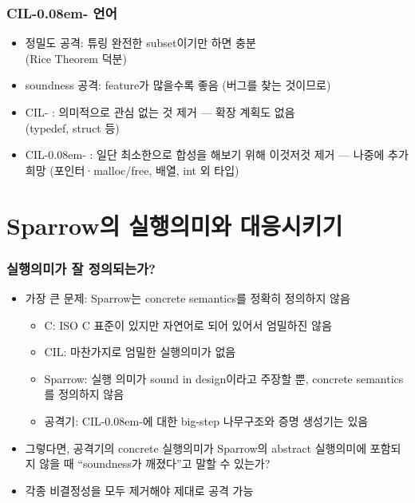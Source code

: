 \documentclass{simplesnt}
\newcommand{\CILmm}{\texorpdfstring{CIL-\kern0.08em-}{CIL--}}
\begin{document}
\begin{frame}
  \frametitle{\CILmm{} 언어}
  \begin{itemize}
    \item<1-> 정밀도 공격: 튜링 완전한 subset이기만 하면 충분 \\
    (Rice Theorem 덕분)
    \item<2-> soundness 공격: feature가 많을수록 좋음 (버그를 찾는 것이므로)
    \item<3-> CIL- : 의미적으로 관심 없는 것 제거 --- 확장 계획도 없음 \\
    (typedef, struct 등)
    \item<4-> \CILmm{} : 일단 최소한으로 합성을 해보기 위해 이것저것 제거 --- 나중에 추가 희망 (포인터·malloc/free, 배열, int 외 타입)
  \end{itemize}
\end{frame}

\section{Sparrow의 실행의미와 대응시키기}

\begin{frame}
  \frametitle{실행의미가 잘 정의되는가?}

  \begin{itemize}
    \item<1-> 가장 큰 문제: Sparrow는 concrete semantics를 정확히 정의하지 않음
      \begin{itemize}
        \item<2-> C: ISO C 표준이 있지만 자연어로 되어 있어서 엄밀하진 않음
        \item<3-> CIL: 마찬가지로 엄밀한 실행의미가 없음
        \item<4-> Sparrow: 실행 의미가 sound in design이라고 주장할 뿐, concrete semantics를 정의하지 않음
        \item<5-> 공격기: \CILmm{}에 대한 big-step 나무구조와 증명 생성기는 있음
      \end{itemize}
    \item<6-> 그렇다면, 공격기의 concrete 실행의미가 Sparrow의 abstract 실행의미에
      포함되지 않을 때 ``soundness가 깨졌다''고 말할 수 있는가?
    \item<7-> 각종 비결정성을 모두 제거해야 제대로 공격 가능
  \end{itemize}
\end{frame}
\end{document}
